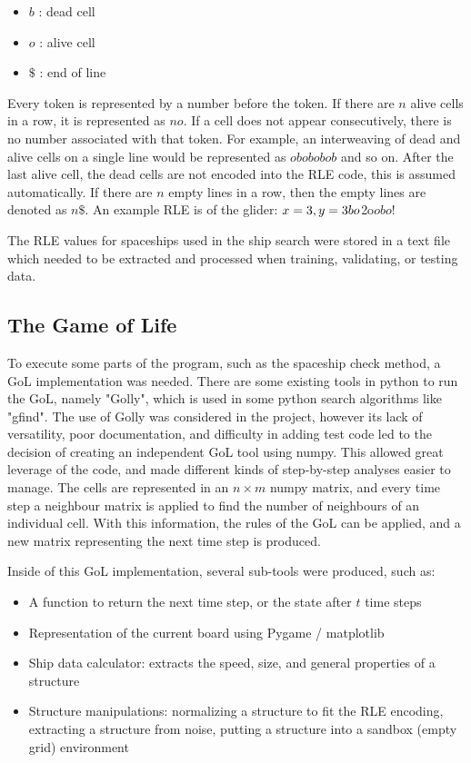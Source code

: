 \documentclass{l4proj}
\begin{document}
\begin{itemize}
    \item $b$ : dead cell
    \item $o$ : alive cell
    \item $\$$ : end of line
\end{itemize}

Every token is represented by a number before the token. If there are $n$ alive cells in a row, it is represented as $no$. If a cell does not appear consecutively, there is no number associated with that token. For example, an interweaving of dead and alive cells on a single line would be represented as $obobobob$ and so on. After the last alive cell, the dead cells are not encoded into the RLE code, this is assumed automatically. If there are $n$ empty lines in a row, then the empty lines are denoted as $n\$$. An example RLE is of the glider: \newline $x=3,y=3 \newline bo$2o$obo!$

The RLE values for spaceships used in the ship search were stored in a text file which needed to be extracted and processed when training, validating, or testing data.

\subsection{The Game of Life}

To execute some parts of the program, such as the spaceship check method, a GoL implementation was needed. There are some existing tools in python to run the GoL, namely "Golly", which is used in some python search algorithms like "gfind". The use of Golly was considered in the project, however its lack of versatility, poor documentation, and difficulty in adding test code led to the decision of creating an independent GoL tool using numpy. This allowed great leverage of the code, and made different kinds of step-by-step analyses easier to manage. The cells are represented in an $n \times m$ numpy matrix, and every time step a neighbour matrix is applied to find the number of neighbours of an individual cell. With this information, the rules of the GoL can be applied, and a new matrix representing the next time step is produced. 

Inside of this GoL implementation, several sub-tools were produced, such as:
\begin{itemize}
    \item A function to return the next time step, or the state after $t$ time steps 
    \item Representation of the current board using Pygame / matplotlib
    \item Ship data calculator: extracts the speed, size, and general properties of a structure
    \item Structure manipulations: normalizing a structure to fit the RLE encoding, extracting a structure from noise, putting a structure into a sandbox (empty grid) environment
\end{itemize}
\end{document}
